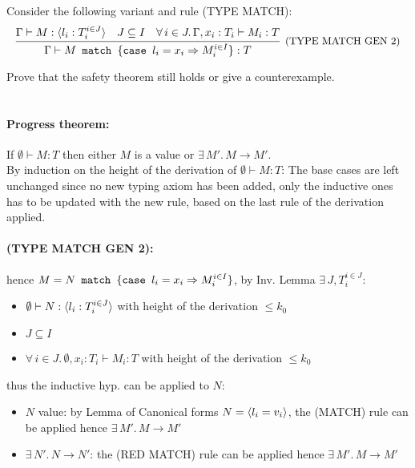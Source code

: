 \subsection{}

Consider the following variant and rule (TYPE MATCH):
\[
\infer[\text{\small{(TYPE MATCH GEN 2)}}] { \Gamma \vdash
  \MATCH{M}{\CASE{l_i}{x_i}{M_i^{i \in I}}}: T } { \Gamma \vdash M:
  \TVAR{l_i: T_i^{i \in J}} & J \subseteq I & \forall\, i \in
  J.\,\Gamma, x_i: T_i \vdash M_i: T }
\]

Prove that the safety theorem still holds or give a
counterexample.\\~\\

\paragraph*{Progress theorem:\\}

If \(\emptyset \vdash M: T\) then either \(M\) is a value or
\(\exists\, M'.\, M \to M'\).\\ By induction on the height of the
derivation of \(\emptyset \vdash M: T\): The base cases are left
unchanged since no new typing axiom has been added, only the inductive
ones has to be updated with the new rule, based on the last rule of
the derivation applied.
\paragraph*{\textmd{(TYPE MATCH GEN 2):}}
hence \(M = N\texttt{ match }\{\texttt{case }l_i = x_i \Rightarrow M_i^{i \in I}\}\), by Inv. Lemma
\(\exists\, J, T_i^{i \in J}\):
\begin{itemize}
\item \(\emptyset \vdash N: \langle l_i: T_i^{i \in J} \rangle\) with height of
  the derivation \(\le k_0\)
\item \(J \subseteq I\)
\item \(\forall\, i \in J.\, \emptyset, x_i: T_i \vdash M_i: T\) with
  height of the derivation \(\le k_0\)
\end{itemize}
thus the inductive hyp. can be applied to \(N\):
\begin{itemize}
\item \(N\) value: by Lemma of Canonical forms \(N = \langle l_i =
  v_i \rangle\), the (MATCH) rule can be applied hence \(\exists\, M'.\, M
  \to M'\)
\item \(\exists\, N'.\, N \to N'\): the (RED MATCH) rule can be
  applied hence \(\exists\, M'.\, M \to M'\)
\end{itemize}

